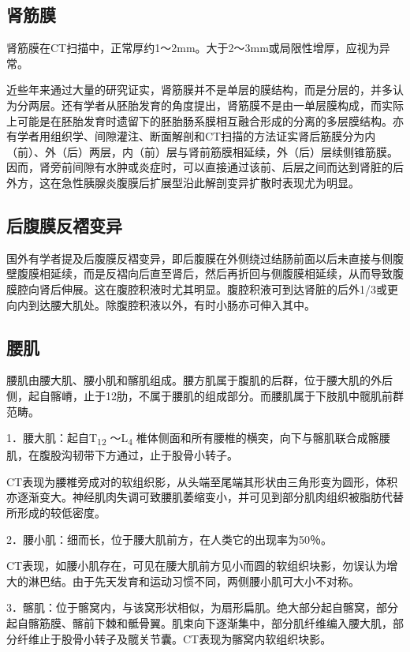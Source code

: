 \subsection{肾筋膜}

肾筋膜在CT扫描中，正常厚约1～2mm。大于2～3mm或局限性增厚，应视为异常。

近些年来通过大量的研究证实，肾筋膜并不是单层的膜结构，而是分层的，并多认为分两层。还有学者从胚胎发育的角度提出，肾筋膜不是由一单层膜构成，而实际上可能是在胚胎发育时遗留下的胚胎肠系膜相互融合形成的分离的多层膜结构。亦有学者用组织学、间隙灌注、断面解剖和CT扫描的方法证实肾后筋膜分为内（前）、外（后）两层，内（前）层与肾前筋膜相延续，外（后）层续侧锥筋膜。因而，肾旁前间隙有水肿或炎症时，可以直接通过该前、后层之间而达到肾脏的后外方，这在急性胰腺炎腹膜后扩展型沿此解剖变异扩散时表现尤为明显。

\subsection{后腹膜反褶变异}

国外有学者提及后腹膜反褶变异，即后腹膜在外侧绕过结肠前面以后未直接与侧腹壁腹膜相延续，而是反褶向后直至肾后，然后再折回与侧腹膜相延续，从而导致腹膜腔向肾后伸展。这在腹腔积液时尤其明显。腹腔积液可到达肾脏的后外1/3或更向内到达腰大肌处。除腹腔积液以外，有时小肠亦可伸入其中。

\subsection{腰肌}

腰肌由腰大肌、腰小肌和髂肌组成。腰方肌属于腹肌的后群，位于腰大肌的外后侧，起自髂嵴，止于12肋，不属于腰肌的组成部分。而腰肌属于下肢肌中髋肌前群范畴。

1．腰大肌：起自T\textsubscript{12} ～L\textsubscript{4}
椎体侧面和所有腰椎的横突，向下与髂肌联合成髂腰肌，在腹股沟韧带下方通过，止于股骨小转子。

CT表现为腰椎旁成对的软组织影，从头端至尾端其形状由三角形变为圆形，体积亦逐渐变大。神经肌肉失调可致腰肌萎缩变小，并可见到部分肌肉组织被脂肪代替所形成的较低密度。

2．腰小肌：细而长，位于腰大肌前方，在人类它的出现率为50％。

CT表现，如腰小肌存在，可见在腰大肌前方见小而圆的软组织块影，勿误认为增大的淋巴结。由于先天发育和运动习惯不同，两侧腰小肌可大小不对称。

3．髂肌：位于髂窝内，与该窝形状相似，为扇形扁肌。绝大部分起自髂窝，部分起自髂筋膜、髂前下棘和骶骨翼。肌束向下逐渐集中，部分肌纤维编入腰大肌，部分纤维止于股骨小转子及髋关节囊。CT表现为髂窝内软组织块影。

